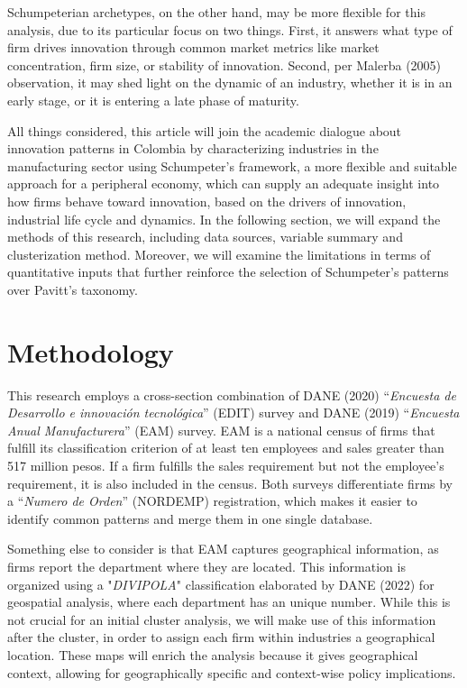 \documentclass[12pt,a4paper]{article}
\begin{document}
Schumpeterian archetypes, on the other hand, may be more flexible for this analysis, due to its particular focus on two things. First, it answers what type of firm drives innovation through common market metrics like market concentration, firm size, or stability of innovation. Second, per Malerba (2005) observation, it may shed light on the dynamic of an industry, whether it is in an early stage, or it is entering a late phase of maturity.  

All things considered, this article will join the academic dialogue about innovation patterns in Colombia by characterizing industries in the manufacturing sector using Schumpeter's framework, a more flexible and suitable approach for a peripheral economy, which can supply an adequate insight into how firms behave toward innovation, based on the drivers of innovation, industrial life cycle and dynamics. In the following section, we will expand the methods of this research, including data sources, variable summary and clusterization method. Moreover, we will examine the limitations in terms of quantitative inputs that further reinforce the selection of Schumpeter’s patterns over Pavitt’s taxonomy. 


\section{Methodology}

This research employs a cross-section combination of DANE (2020) “\textit{Encuesta de Desarrollo e innovación tecnológica}” (EDIT) survey and DANE (2019) “\textit{Encuesta Anual Manufacturera}” (EAM) survey. EAM is a national census of firms that fulfill its classification criterion of at least ten employees and sales greater than 517 million pesos. If a firm fulfills the sales requirement but not the employee's requirement, it is also included in the census. Both surveys differentiate firms by a “\textit{Numero de Orden}” (NORDEMP) registration, which makes it easier to identify common patterns and merge them in one single database. 

Something else to consider is that EAM captures geographical information, as firms report the department where they are located. This information is organized using a "\textit{DIVIPOLA}" classification elaborated by DANE (2022) for geospatial analysis, where each department has an unique number. While this is not crucial for an initial cluster analysis, we will make use of this information after the cluster, in order to assign each firm within industries a geographical location. These maps will enrich the analysis because it gives geographical context, allowing for geographically specific and context-wise policy implications.
\end{document}
